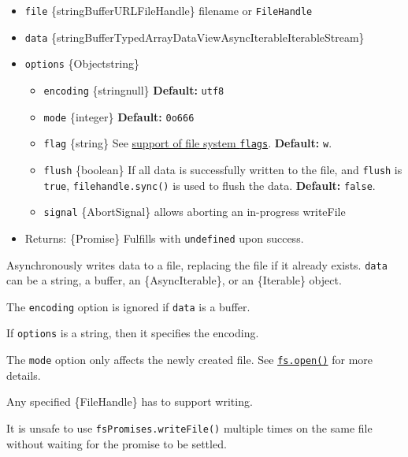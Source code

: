 \begin{itemize}
\tightlist
\item
  \texttt{file} \{string\textbar Buffer\textbar URL\textbar FileHandle\}
  filename or \texttt{FileHandle}
\item
  \texttt{data}
  \{string\textbar Buffer\textbar TypedArray\textbar DataView\textbar AsyncIterable\textbar Iterable\textbar Stream\}
\item
  \texttt{options} \{Object\textbar string\}

  \begin{itemize}
  \tightlist
  \item
    \texttt{encoding} \{string\textbar null\} \textbf{Default:}
    \texttt{\textquotesingle{}utf8\textquotesingle{}}
  \item
    \texttt{mode} \{integer\} \textbf{Default:} \texttt{0o666}
  \item
    \texttt{flag} \{string\} See \hyperref[file-system-flags]{support of
    file system \texttt{flags}}. \textbf{Default:}
    \texttt{\textquotesingle{}w\textquotesingle{}}.
  \item
    \texttt{flush} \{boolean\} If all data is successfully written to
    the file, and \texttt{flush} is \texttt{true},
    \texttt{filehandle.sync()} is used to flush the data.
    \textbf{Default:} \texttt{false}.
  \item
    \texttt{signal} \{AbortSignal\} allows aborting an in-progress
    writeFile
  \end{itemize}
\item
  Returns: \{Promise\} Fulfills with \texttt{undefined} upon success.
\end{itemize}

Asynchronously writes data to a file, replacing the file if it already
exists. \texttt{data} can be a string, a buffer, an \{AsyncIterable\},
or an \{Iterable\} object.

The \texttt{encoding} option is ignored if \texttt{data} is a buffer.

If \texttt{options} is a string, then it specifies the encoding.

The \texttt{mode} option only affects the newly created file. See
\hyperref[fsopenpath-flags-mode-callback]{\texttt{fs.open()}} for more
details.

Any specified \{FileHandle\} has to support writing.

It is unsafe to use \texttt{fsPromises.writeFile()} multiple times on
the same file without waiting for the promise to be settled.

